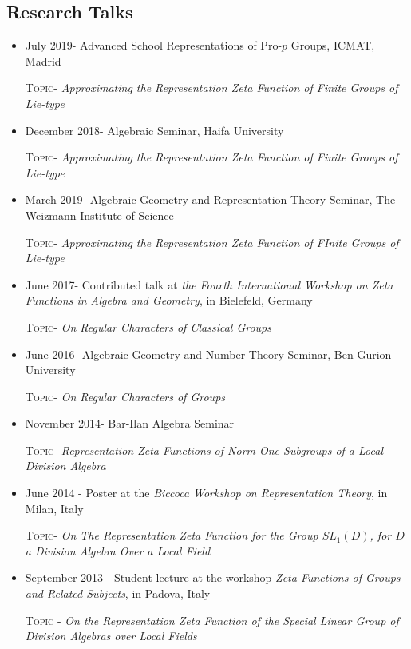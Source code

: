 \documentclass[leqno,10pt]{article}
\begin{document}
\subsection*{Research Talks}
\begin{itemize}
\item July 2019- Advanced School Representations of Pro-$p$ Groups, ICMAT, Madrid

\textsc{Topic}- \textit{Approximating the Representation Zeta Function of Finite Groups of Lie-type}
\item December 2018- Algebraic Seminar, Haifa University

\textsc{Topic}- \textit{Approximating the Representation Zeta Function of Finite Groups of Lie-type}
\item March 2019- Algebraic Geometry and Representation Theory Seminar, The Weizmann Institute of Science

\textsc{Topic}- \textit{Approximating the Representation Zeta Function of FInite Groups of Lie-type}
\item June 2017- Contributed talk at \textit{the Fourth International Workshop on Zeta Functions in Algebra and Geometry}, in Bielefeld, Germany

\textsc{Topic}- \textit{On Regular Characters of Classical Groups}

\item June 2016- Algebraic Geometry and Number Theory Seminar, Ben-Gurion University

\textsc{Topic}- \textit{ On Regular Characters of Groups}

\item November 2014- Bar-Ilan Algebra Seminar

\textsc{Topic}- \textit{ Representation Zeta Functions of Norm One Subgroups of a Local Division Algebra}

\item June 2014 -  Poster at the {\it Biccoca Workshop on Representation Theory}, in Milan, Italy

\textsc{Topic}- \textit{ On The Representation Zeta Function for the Group $SL_1(D)$, for $D$ a Division Algebra Over a Local Field}


\item September 2013 - Student lecture at the workshop \textit{Zeta Functions of Groups and Related Subjects}, in Padova, Italy

\textsc{Topic} - \textit{On the Representation Zeta Function of the Special Linear Group of Division Algebras over Local Fields}



\end{itemize}
\end{document}
